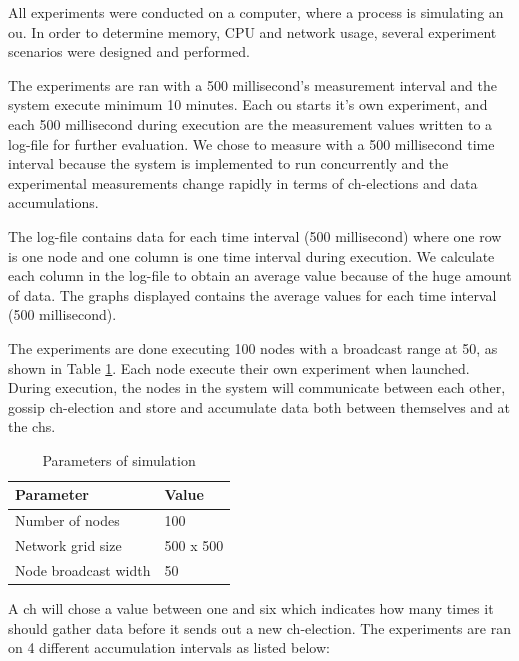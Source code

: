 \documentclass[USenglish]{uit-thesis}
\begin{document}
All experiments were conducted on a computer, where a process is simulating an \gls{ou}. In order to determine memory, CPU and network usage, several experiment scenarios were designed and performed.

The experiments are ran with a 500 millisecond's measurement interval and the system execute minimum 10 minutes. Each \gls{ou} starts it's own experiment, and each 500 millisecond during execution are the measurement values written to a log-file for further evaluation. We chose to measure with a 500 millisecond time interval because the system is implemented to run concurrently and the experimental measurements change rapidly in terms of \gls{ch}-elections and data accumulations. 

The log-file contains data for each time interval (500 millisecond) where  one row is one node and one column is one time interval during execution. We calculate each column in the log-file to obtain an average value because of the huge amount of data. The graphs displayed contains the average values for each time interval (500 millisecond).

The experiments are done executing 100 nodes with a broadcast range at 50, as shown in Table \ref{tab:simTable}. Each node execute their own experiment when launched. During execution, the nodes in the system will communicate between each other, gossip \gls{ch}-election and store and accumulate data both between themselves and at the \glspl{ch}.

\begin{table} [t]
\centering
\begin{tabular}{|l|l|}
\hline
\textbf{Parameter}       & \textbf{Value} \\ \hline
Number of nodes          & 100            \\ \hline
Network grid size        & 500 x 500      \\ \hline
Node broadcast width     & 50             \\ \hline
\end{tabular}
\caption{Parameters of simulation}
\label{tab:simTable}
\end{table}


A \gls{ch} will chose a value between one and six which indicates how many times it should gather data before it sends out a new \gls{ch}-election. The experiments are ran on 4 different accumulation intervals as listed below:
\end{document}
